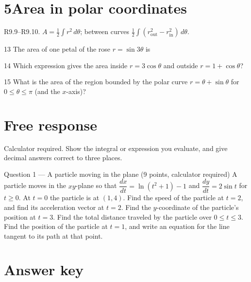 \documentclass{apcalc}
\begin{document}
\section*{5\quad Area in polar coordinates}
\begin{setrule}R9.9–R9.10. $A=\frac12\int r^2\,d\theta$; between curves $\frac12\int(r_{\text{out}}^2-r_{\text{in}}^2)\,d\theta$.\end{setrule}
\begin{q}{13}
The area of one petal of the rose $r=\sin3\theta$ is
\end{q}
\begin{q}{14}
Which expression gives the area inside $r=3\cos\theta$ and outside $r=1+\cos\theta$?
\end{q}
\begin{q}{15}
What is the area of the region bounded by the polar curve $r=\theta+\sin\theta$ for $0\le\theta\le\pi$ (and the $x$-axis)?\calcmark
{}
\end{q}
\clearpage\section*{Free response}
Calculator required. Show the integral or expression you evaluate, and give decimal answers correct to three places.
\begin{frq}{Question 1 --- A particle moving in the plane (9 points, calculator required)}
A particle moves in the $xy$-plane so that $\dfrac{dx}{dt}=\ln(t^2+1)-1$ and $\dfrac{dy}{dt}=2\sin t$ for $t\ge0$. At $t=0$ the particle is at $(1,4)$.
Find the speed of the particle at $t=2$, and find its acceleration vector at $t=2$.\workspace{1.6in}
Find the $y$-coordinate of the particle's position at $t=3$.\workspace{1.6in}
Find the total distance traveled by the particle over $0\le t\le3$.\workspace{1.6in}
Find the position of the particle at $t=1$, and write an equation for the line tangent to its path at that point.\workspace{1.6in}
\end{frq}
\clearpage\section*{Answer key}
\end{document}

